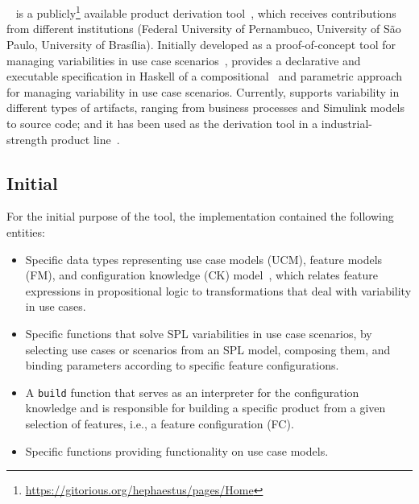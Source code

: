 
\section{\hp}
\label{sec:hephaestus}

\hp~\cite{rbonifacio:sbcars2009} is a
publicly\footnote{\url{https://gitorious.org/hephaestus/pages/Home}}
available product derivation tool~\cite{deelstra:2005}, which receives
contributions from different institutions (Federal University of
Pernambuco, University of S\~{a}o Paulo, University of
Bras\'{i}lia). Initially developed as a proof-of-concept tool for
managing variabilities in use case
scenarios~\cite{rbonifacio:aosd2009}, \hp{} provides a declarative and
executable specification in Haskell of a
compositional~\cite{kastner:2008} and parametric approach for managing
variability in use case scenarios.  Currently, \hp{} supports
variability in different types of artifacts, ranging from business
processes and Simulink models to source code; and it has been used as
the derivation tool in a industrial-strength product
line~\cite{ferreira:2010}.


\subsection{Initial \hp}
\label{S:initial-hp}

For the initial purpose of the tool, the implementation contained the
following entities:

\begin{itemize}
\item Specific data types representing use case models (UCM), feature
  models (FM), and configuration knowledge (CK) model~\cite{gpbook},
  which relates feature expressions in propositional logic to
  transformations that deal with variability in use cases.

\item Specific functions that solve SPL variabilities in use case
  scenarios, by selecting use cases or scenarios from an SPL model,
  composing them, and binding parameters according to specific feature
  configurations.

\item A \texttt{build} function that serves as an interpreter for the
  configuration knowledge and is responsible for building a specific
  product from a given selection of features, i.e., a feature
  configuration (FC).

\item Specific functions providing functionality on use case models.

\end{itemize}

